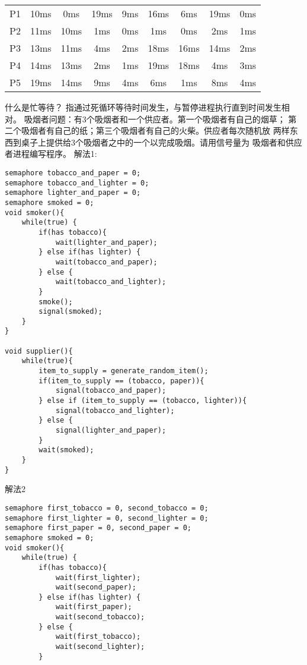 \documentclass{ctexart}
\begin{document}
\begin{outline}[enumerate]
\begin{table}[H]
\begin{tabular}{*{9}{c}}
            \midrule
            P1 & 10ms & 0ms & 19ms & 9ms & 16ms & 6ms & 19ms & 0ms \\
            P2 & 11ms & 10ms & 1ms & 0ms & 1ms & 0ms & 2ms & 1ms \\
            P3 & 13ms & 11ms & 4ms & 2ms & 18ms & 16ms & 14ms & 2ms \\
            P4 & 14ms & 13ms & 2ms & 1ms & 19ms & 18ms & 4ms & 3ms \\
            P5 & 19ms & 14ms & 9ms & 4ms & 6ms & 1ms & 8ms & 4ms \\
            \bottomrule
            \end{tabular}
        \end{table}
    \1 什么是忙等待？
        指通过死循环等待时间发生，与暂停进程执行直到时间发生相对。
    \1 吸烟者问题：有3个吸烟者和一个供应者。第一个吸烟者有自己的烟草；
    第二个吸烟者有自己的纸；第三个吸烟者有自己的火柴。供应者每次随机放
    两样东西到桌子上提供给3个吸烟者之中的一个以完成吸烟。请用信号量为
    吸烟者和供应者进程编写程序。
        \2 解法1:
\begin{verbatim}
semaphore tobacco_and_paper = 0;
semaphore tobacco_and_lighter = 0;
semaphore lighter_and_paper = 0;
semaphore smoked = 0;
void smoker(){
    while(true) {
        if(has tobacco){
            wait(lighter_and_paper);
        } else if(has lighter) {
            wait(tobacco_and_paper);
        } else {
            wait(tobacco_and_lighter);
        }
        smoke();
        signal(smoked);
    }
}

void supplier(){
    while(true){
        item_to_supply = generate_random_item();
        if(item_to_supply == (tobacco, paper)){
            signal(tobacco_and_paper);
        } else if (item_to_supply == (tobacco, lighter)){
            signal(tobacco_and_lighter);
        } else {
            signal(lighter_and_paper);
        }
        wait(smoked);
    }
}
\end{verbatim}
        \2 解法2
\begin{verbatim}
semaphore first_tobacco = 0, second_tobacco = 0;
semaphore first_lighter = 0, second_lighter = 0;
semaphore first_paper = 0, second_paper = 0;
semaphore smoked = 0;
void smoker(){
    while(true) {
        if(has tobacco){
            wait(first_lighter);
            wait(second_paper);
        } else if(has lighter) {
            wait(first_paper);
            wait(second_tobacco);
        } else {
            wait(first_tobacco);
            wait(second_lighter);
        }


\end{verbatim}
\end{outline}
\end{document}
